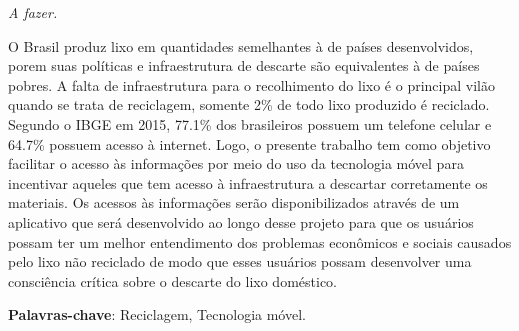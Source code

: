 \documentclass[
	12pt,				%
	openright,			%
	twoside,			%
	a4paper,			%
	english,			%
	french,				%
	spanish,			%
	brazil				%
	]{abntex2}
\begin{document}
\begin{dedicatoria}
   \vspace*{\fill}
   \centering
   \noindent
   \textit{ A fazer.} \vspace*{\fill}
\end{dedicatoria}

\begin{agradecimentos}


\end{agradecimentos}





\setlength{\absparsep}{18pt} %
\begin{resumo}

 O Brasil produz lixo em quantidades semelhantes à de países desenvolvidos, porem suas políticas e infraestrutura de descarte são equivalentes à de países pobres. A falta de infraestrutura para o recolhimento do lixo é o principal vilão quando se trata de reciclagem, somente 2\% de todo lixo produzido é reciclado.
	Segundo o IBGE em 2015, 77.1\% dos brasileiros possuem um telefone celular e 64.7\% possuem acesso à internet. Logo, o presente trabalho tem como objetivo facilitar o acesso às informações por meio do uso da tecnologia móvel para incentivar aqueles que tem acesso à infraestrutura a descartar corretamente os materiais. Os acessos às informações serão disponibilizados através de um aplicativo que será desenvolvido ao longo desse projeto para que os usuários possam ter um melhor entendimento dos problemas econômicos e sociais causados pelo lixo não reciclado de modo que esses usuários possam desenvolver uma consciência crítica sobre o descarte do lixo doméstico.


 \textbf{Palavras-chave}: Reciclagem, Tecnologia móvel.
\end{resumo}
\end{document}
